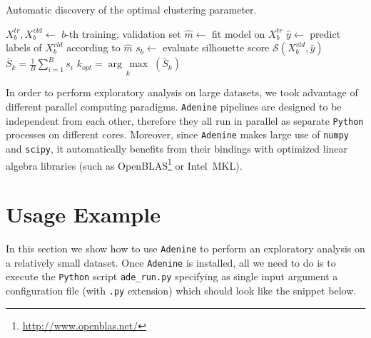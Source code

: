 \documentclass[twoside,11pt]{article}
\makeatletter
\newcommand{\argmax}[1]{\underset{#1}{\operatorname{arg}\,\operatorname{max}}\;}
\newcommand{\ade}{\texttt{Adenine}\@\xspace}
\newcommand{\py}{\texttt{Python}\@\xspace}
\makeatother
\begin{document}
\begin{enumerate}[leftmargin=*]
\begin{algorithm}
\caption{Automatic discovery of the optimal clustering parameter.}\label{alg:clusters}
\label{alg:clusters}
\begin{algorithmic}[1]
                \State $X^{tr}_b,X^{vld}_b\leftarrow$ $b$-th training, validation set
                \State $\hat{m}\leftarrow$ fit model on $X^{tr}_b$
                \State $\hat{y}\leftarrow$ predict labels of $X^{vld}_b$ according to $\hat{m}$
                \State $s_b\leftarrow$ evaluate silhouette score  $\mathcal{S}(X^{vld}_b,\hat{y})$
	\EndFor    
	\State $\bar{S}_k = \frac{1}{B}\sum_{i=1}^B s_i$
\EndFor
\State $k_{opt} = \argmax{k}(\bar{S}_k)$
\end{algorithmic}
\end{algorithm}

\end{enumerate}

\noindent In order to perform exploratory analysis on large datasets, we took advantage of different parallel computing paradigms. \ade pipelines are designed to be independent from each other, therefore they all run in parallel as separate \py processes on different cores. Moreover, since \ade makes large use of \texttt{numpy} and \texttt{scipy}, it automatically benefits from their bindings with optimized linear algebra libraries (such as OpenBLAS\footnote{\href{http://www.openblas.net/}{http://www.openblas.net/}} or Intel\textsuperscript{\textregistered}~MKL).

\section{Usage Example}
In this section we show how to use \ade to perform an exploratory analysis on a relatively small dataset. Once \ade is installed, all we need to do is to execute the \py script \texttt{ade\_run.py} specifying as single input argument a configuration file (with \texttt{.py} extension) which should look like the snippet below.
 

\end{document}
